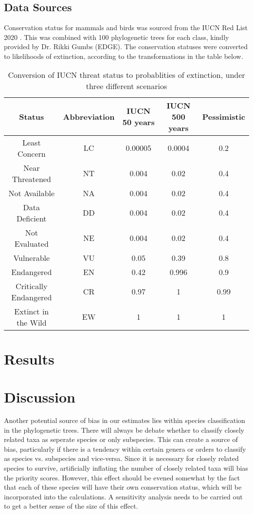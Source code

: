 \documentclass[10pt]{article}
\begin{document}
	\subsection{Data Sources}
	Conservation status for mammals and birds was sourced from the IUCN Red List 2020 \cite{iucnIUCNRedList2021, IUCNRedList2012}. This was combined with 100 phylogenetic trees for each class, kindly provided by Dr. Rikki Gumbs (EDGE). The conservation statuses were converted to likelihoods of extinction, according to the transformations in the table below.
	
	\begin{table}[b]
		\begin{tabular}{|c|c c c c|}
			\hline
			Status & Abbreviation & IUCN 50 years & IUCN 500 years & Pessimistic \\
			\hline
			Least Concern & LC & 0.00005 & 0.0004 & 0.2 \\
			Near Threatened & NT & 0.004 & 0.02 & 0.4 \\
			Not Available & NA & 0.004 & 0.02 & 0.4 \\
			Data Deficient & DD & 0.004 & 0.02 & 0.4 \\
			Not Evaluated & NE & 0.004 & 0.02 & 0.4 \\
			Vulnerable & VU & 0.05 & 0.39 & 0.8 \\
			Endangered & EN & 0.42 & 0.996 & 0.9 \\
			Critically Endangered & CR & 0.97 & 1 & 0.99 \\
			Extinct in the Wild & EW & 1 & 1 & 1 \\
			\hline
		\end{tabular}
		\caption{Conversion of IUCN threat status to probablities of extinction, under three
			different scenarios \cite{mooersConvertingEndangeredSpecies2008}}
	\end{table}
	\section{Results}
	
	\section{Discussion}
	Another potential source of bias in our estimates lies within species
	classification in the phylogenetic trees. There will always be debate whether
	to classify closely related taxa as seperate species or only subspecies. This
	can create a source of bias, particularly if there is a tendency within certain
	genera or orders to classify as species vs. subspecies and vice-versa. Since it
	is necessary for closely related species to survive, artificially inflating the
	number of closely related taxa will bias the priority scores. However, this
	effect should be evened somewhat by the fact that each of these species will 
	have their own conservation status, which will be incorporated into the
	calculations. A sensitivity analysis needs to be carried out to get a better
	sense of the size of this effect.
	
	
	
\end{document}

